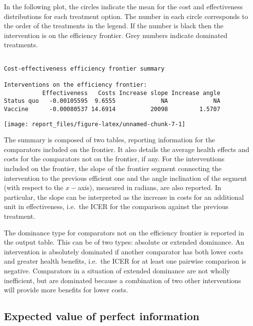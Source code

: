 \documentclass[]{article}
\begin{document}
In the following plot, the circles indicate the mean for the cost and
effectiveness distributions for each treatment option. The number in
each circle corresponds to the order of the treatments in the legend. If
the number is black then the intervention is on the efficiency frontier.
Grey numbers indicate dominated treatments.

\begin{verbatim}

Cost-effectiveness efficiency frontier summary 

Interventions on the efficiency frontier:
           Effectiveness   Costs Increase slope Increase angle
Status quo   -0.00105595  9.6555             NA             NA
Vaccine      -0.00080537 14.6914          20098         1.5707
\end{verbatim}

\begin{center}\texttt{[image: report\_files/figure-latex/unnamed-chunk-7-1]} \end{center}

The summary is composed of two tables, reporting information for the
comparators included on the frontier. It also details the average health
effects and costs for the comparators not on the frontier, if any. For
the interventions included on the frontier, the slope of the frontier
segment connecting the intervention to the previous efficient one and
the angle inclination of the segment (with respect to the \(x-\)axis),
measured in radians, are also reported. In particular, the slope can be
interpreted as the increase in costs for an additional unit in
effectiveness, i.e.~the ICER for the comparison against the previous
treatment.

The dominance type for comparators not on the efficiency frontier is
reported in the output table. This can be of two types: absolute or
extended dominance. An intervention is absolutely dominated if another
comparator has both lower costs and greater health benefits, i.e.~the
ICER for at least one pairwise comparison is negative. Comparators in a
situation of extended dominance are not wholly inefficient, but are
dominated because a combination of two other interventions will provide
more benefits for lower costs.

\subsection{Expected value of perfect
information}\label{expected-value-of-perfect-information}
\end{document}
